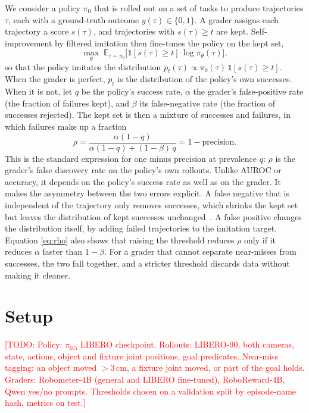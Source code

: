 \documentclass[letterpaper, journal, twoside]{IEEEtran}
\newcommand{\todo}[1]{\textcolor{red}{[TODO: #1]}}
\newcommand{\pizerofive}{$\pi_{0.5}$}
\begin{document}
We consider a policy $\pi_0$ that is rolled out on a set of tasks to produce trajectories $\tau$, each with a
ground-truth outcome $y(\tau) \in \{0, 1\}$. A grader assigns each trajectory a score $s(\tau)$, and trajectories with
$s(\tau) \geq t$ are kept. Self-improvement by filtered imitation then fine-tunes the policy on the kept set,
\begin{equation}
  \max_\theta \; \mathbb{E}_{\tau \sim \pi_0} \big[ \mathbb{1}[s(\tau) \geq t] \, \log \pi_\theta(\tau) \big],
\end{equation}
so that the policy imitates the distribution $p_t(\tau) \propto \pi_0(\tau)\,\mathbb{1}[s(\tau) \geq t]$. When the
grader is perfect, $p_t$ is the distribution of the policy's own successes. When it is not, let $q$ be the policy's
success rate, $\alpha$ the grader's false-positive rate (the fraction of failures kept), and $\beta$ its
false-negative rate (the fraction of successes rejected). The kept set is then a mixture of successes and failures,
in which failures make up a fraction
\begin{equation}
  \rho = \frac{\alpha (1 - q)}{\alpha (1 - q) + (1 - \beta)\, q} = 1 - \text{precision}.
  \label{eq:rho}
\end{equation}
This is the standard expression for one minus precision at prevalence $q$: $\rho$ is the grader's false discovery
rate on the policy's own rollouts. Unlike AUROC or accuracy, it depends on the policy's success rate as well as on the
grader. It makes the asymmetry between the two errors explicit. A false negative that is independent of the
trajectory only removes successes, which shrinks the kept set but leaves the distribution of kept successes
unchanged~\cite{elkan2008pu}.
A false positive changes the distribution itself, by adding failed trajectories to the imitation target. Equation
\eqref{eq:rho} also shows that raising the threshold reduces $\rho$ only if it reduces $\alpha$ faster than
$1 - \beta$. For a grader that cannot separate near-misses from successes, the two fall together, and a stricter
threshold discards data without making it cleaner.

\section{Setup}
\todo{Policy: \pizerofive{} LIBERO checkpoint. Rollouts: LIBERO-90, both cameras, state, actions, object and fixture
joint positions, goal predicates. Near-miss tagging: an object moved $>$3\,cm, a fixture joint moved, or part of the goal
holds. Graders: Robometer-4B (general and LIBERO fine-tuned), RoboReward-4B, Qwen yes/no prompts. Thresholds chosen on
a validation split by episode-name hash, metrics on test.}
\end{document}
